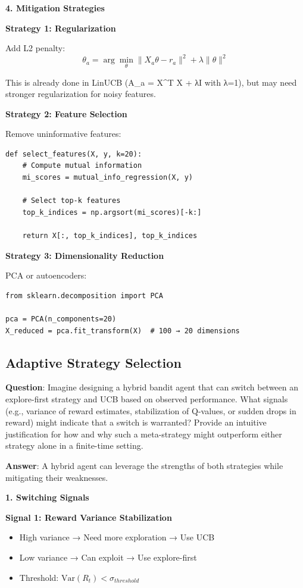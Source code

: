 \documentclass[12pt]{article}
\begin{document}
{{{\textbf{4. Mitigation Strategies}

\textbf{Strategy 1: Regularization}

Add L2 penalty:
\begin{equation}
\theta_a = \arg\min_\theta \|X_a \theta - r_a\|^2 + \lambda\|\theta\|^2
\end{equation}

This is already done in LinUCB (A_a = X^T X + λI with λ=1), but may need stronger regularization for noisy features.

\textbf{Strategy 2: Feature Selection}

Remove uninformative features:
\begin{verbatim}
def select_features(X, y, k=20):
    # Compute mutual information
    mi_scores = mutual_info_regression(X, y)

    # Select top-k features
    top_k_indices = np.argsort(mi_scores)[-k:]

    return X[:, top_k_indices], top_k_indices
\end{verbatim}

\textbf{Strategy 3: Dimensionality Reduction}

PCA or autoencoders:
\begin{verbatim}
from sklearn.decomposition import PCA

pca = PCA(n_components=20)
X_reduced = pca.fit_transform(X)  # 100 → 20 dimensions
\end{verbatim}

\subsection{Adaptive Strategy Selection}

\textbf{Question}: Imagine designing a hybrid bandit agent that can switch between an explore-first strategy and UCB based on observed performance. What signals (e.g., variance of reward estimates, stabilization of Q-values, or sudden drops in reward) might indicate that a switch is warranted? Provide an intuitive justification for how and why such a meta-strategy might outperform either strategy alone in a finite-time setting.

\textbf{Answer}: A hybrid agent can leverage the strengths of both strategies while mitigating their weaknesses.

\textbf{1. Switching Signals}

\textbf{Signal 1: Reward Variance Stabilization}
\begin{itemize}
\item High variance → Need more exploration → Use UCB
\item Low variance → Can exploit → Use explore-first
\item Threshold: $\text{Var}(R_t) < \sigma_{threshold}$
\end{itemize}

}}}
\end{document}

